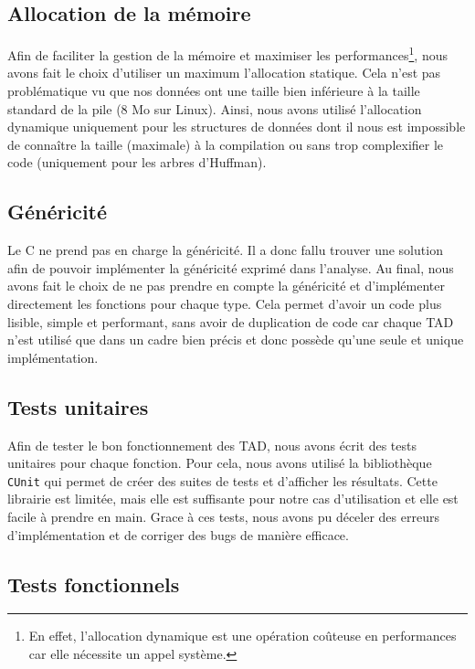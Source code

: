 \subsection{Allocation de la mémoire}

Afin de faciliter la gestion de la mémoire et maximiser les performances\footnote{En effet, l'allocation dynamique est une opération coûteuse en performances car elle nécessite un appel système.},
nous avons fait le choix d'utiliser un maximum l'allocation statique.
Cela n'est pas problématique vu que nos données ont une taille bien inférieure à la taille standard de la pile (8 Mo sur Linux).
Ainsi, nous avons utilisé l'allocation dynamique uniquement pour les structures de données dont il nous est impossible de connaître la taille (maximale) à la compilation ou sans trop complexifier le code
(uniquement pour les arbres d'Huffman).

\subsection{Généricité}

Le C ne prend pas en charge la généricité. Il a donc fallu trouver une solution afin de pouvoir implémenter la généricité exprimé dans l'analyse.
Au final, nous avons fait le choix de ne pas prendre en compte la généricité et d'implémenter directement les fonctions pour chaque type.
Cela permet d'avoir un code plus lisible, simple et performant, sans avoir de duplication de code car chaque TAD n'est utilisé que dans un cadre bien précis et donc possède qu'une seule et unique implémentation.

\subsection{Tests unitaires}

Afin de tester le bon fonctionnement des TAD, nous avons écrit des tests unitaires pour chaque fonction.
Pour cela, nous avons utilisé la bibliothèque \texttt{CUnit} qui permet de créer des suites de tests et d'afficher les résultats.
Cette librairie est limitée, mais elle est suffisante pour notre cas d'utilisation et elle est facile à prendre en main.
Grace à ces tests, nous avons pu déceler des erreurs d'implémentation et de corriger des bugs de manière efficace.

\subsection{Tests fonctionnels}

